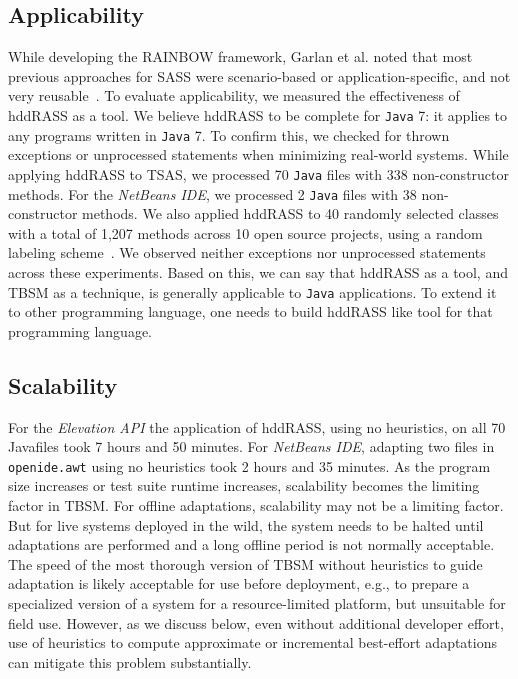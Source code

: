 \subsection{Applicability}
While developing the RAINBOW framework, Garlan et al. noted that most previous approaches for SASS were scenario-based or application-specific, and not very reusable~\cite{garlan2004rainbow}. To evaluate applicability, we measured the effectiveness of hddRASS as a tool. We believe hddRASS to be complete for \texttt{Java} 7: it applies to any programs written in \texttt{Java} 7. To confirm this, we checked for thrown exceptions or unprocessed statements when minimizing real-world systems. While applying hddRASS to TSAS, we processed 70 \texttt{Java} files with 338 non-constructor methods. For the \textit{NetBeans IDE}, we processed 2 \texttt{Java} files with 38 non-constructor methods. We also applied hddRASS to 40 randomly selected classes with a total of 1,207 methods across 10 open source projects, using a random labeling scheme~\cite{christi2018qrs}. We observed neither exceptions nor unprocessed statements across these experiments. Based on this, we can say that hddRASS as a tool, and TBSM as a technique, is generally applicable to \texttt{Java} applications. To extend it to other programming language, one needs to build hddRASS like tool for that programming language.    

\subsection{Scalability}
For the \textit{Elevation API} the application of hddRASS, using no heuristics, on all 70 Javafiles took 7 hours and 50 minutes. For \textit{NetBeans IDE}, adapting two files in \texttt{openide.awt} using no heuristics took 2 hours and 35 minutes. As the program size increases or test suite runtime increases, scalability becomes the limiting factor in TBSM. For offline adaptations, scalability may not be a limiting factor. But for live systems deployed in the wild, the system needs to be halted until adaptations are performed and a long offline period is not normally acceptable.  The speed of the most thorough version of TBSM without heuristics to guide adaptation is likely acceptable for use before deployment, e.g., to prepare a specialized version of a system for a resource-limited platform, but unsuitable for field use.  However, as we discuss below, even without additional developer effort, use of heuristics to compute approximate or incremental best-effort adaptations can mitigate this problem substantially.

